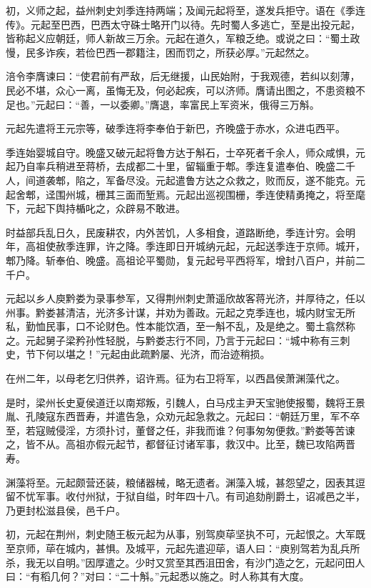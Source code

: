 \documentclass[12pt,UTF8]{ctexbook}
\begin{document}
初，义师之起，益州刺史刘季连持两端；及闻元起将至，遂发兵拒守。语在《季连传》。元起至巴西，巴西太守硃士略开门以待。先时蜀人多逃亡，至是出投元起，皆称起义应朝廷，师人新故三万余。元起在道久，军粮乏绝。或说之曰：“蜀土政慢，民多诈疾，若俭巴西一郡籍注，困而罚之，所获必厚。”元起然之。

涪令李膺谏曰：“使君前有严敌，后无继援，山民始附，于我观德，若纠以刻薄，民必不堪，众心一离，虽悔无及，何必起疾，可以济师。膺请出图之，不患资粮不足也。”元起曰：“善，一以委卿。”膺退，率富民上军资米，俄得三万斛。

元起先遣将王元宗等，破季连将李奉伯于新巴，齐晚盛于赤水，众进屯西平。

季连始婴城自守。晚盛又破元起将鲁方达于斛石，士卒死者千余人，师众咸惧，元起乃自率兵稍进至蒋桥，去成都二十里，留辎重于郫。季连复遣奉伯、晚盛二千人，间道袭郫，陷之，军备尽没。元起遣鲁方达之众救之，败而反，遂不能克。元起舍郫，迳围州城，栅其三面而堑焉。元起出巡视围栅，季连使精勇掩之，将至麾下，元起下舆持楯叱之，众辟易不敢进。

时益部兵乱日久，民废耕农，内外苦饥，人多相食，道路断绝，季连计穷。会明年，高祖使赦季连罪，许之降。季连即日开城纳元起，元起送季连于京师。城开，郫乃降。斩奉伯、晚盛。高祖论平蜀勋，复元起号平西将军，增封八百户，并前二千户。

元起以乡人庾黔娄为录事参军，又得荆州刺史萧遥欣故客蒋光济，并厚待之，任以州事。黔娄甚清洁，光济多计谋，并劝为善政。元起之克季连也，城内财宝无所私，勤恤民事，口不论财色。性本能饮酒，至一斛不乱，及是绝之。蜀土翕然称之。元起舅子梁矜孙性轻脱，与黔娄志行不同，乃言于元起曰：“城中称有三刺史，节下何以堪之！”元起由此疏黔屡、光济，而治迹稍损。

在州二年，以母老乞归供养，诏许焉。征为右卫将军，以西昌侯萧渊藻代之。

是时，梁州长史夏侯道迁以南郑叛，引魏人，白马戍主尹天宝驰使报蜀，魏将王景胤、孔陵寇东西晋寿，并遣告急，众劝元起急救之。元起曰：“朝廷万里，军不卒至，若寇贼侵淫，方须扑讨，董督之任，非我而谁？何事匆匆便救。”黔娄等苦谏之，皆不从。高祖亦假元起节，都督征讨诸军事，救汉中。比至，魏已攻陷两晋寿。

渊藻将至。元起颇营还装，粮储器械，略无遗者。渊藻入城，甚怨望之，因表其逗留不忧军事。收付州狱，于狱自缢，时年四十八。有司追劾削爵土，诏减邑之半，乃更封松滋县侯，邑千户。

初，元起在荆州，刺史随王板元起为从事，别驾庾荜坚执不可，元起恨之。大军既至京师，荜在城内，甚惧。及城平，元起先遣迎荜，语人曰：“庾别驾若为乱兵所杀，我无以自明。”因厚遣之。少时又赏至其西沮田舍，有沙门造之乞，元起问田人曰：“有稻几何？”对曰：“二十斛。”元起悉以施之。时人称其有大度。
\end{document}

